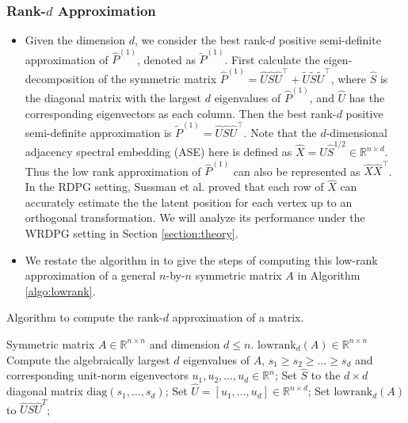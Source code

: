 \documentclass[a4paper]{article}
\renewcommand{\hat}{\widehat}
\begin{document}
\subsubsection{Rank-$d$ Approximation}
\begin{itemize}
\item Given the dimension $d$, we consider the best rank-$d$ positive semi-definite approximation of $\hat{P}^{(1)}$, denoted as $\widetilde{P}^{(1)}$. First calculate the eigen-decomposition of the symmetric matrix $\hat{P}^{(1)} = \hat{U} \hat{S} \hat{U}^{\top} + \widetilde{U} \widetilde{S} \widetilde{U}^{\top}$, where $\hat{S}$ is the diagonal matrix with the largest $d$ eigenvalues of $\hat{P}^{(1)}$, and $\hat{U}$ has the corresponding eigenvectors as each column. Then the best rank-$d$ positive semi-definite approximation is $\widetilde{P}^{(1)} = \hat{U} \hat{S} \hat{U}^{\top}$. Note that the $d$-dimensional adjacency spectral embedding (ASE) here is defined as $\hat{X} = \hat{U} \hat{S}^{1/2} \in \mathbb{R}^{n \times d}$. Thus the low rank approximation of $\hat{P}^{(1)}$ can also be represented as $\hat{X} \hat{X}^{\top}$. In the RDPG setting, Sussman et al. \cite{sussman2014consistent} proved that each row of $\hat{X}$ can accurately estimate the the latent position for each vertex up to an orthogonal transformation. We will analyze its performance under the WRDPG setting in Section \ref{section:theory}.
\item We restate the algorithm in \cite{tang2016law} to give the steps of computing this low-rank approximation of a general $n$-by-$n$ symmetric matrix $A$ in Algorithm \ref{algo:lowrank}.
\end{itemize}
\begin{algorithm}[H]
\caption{Algorithm to compute the rank-$d$ approximation of a matrix.}
\label{algo:lowrank}
\begin{algorithmic}[1]
\REQUIRE Symmetric matrix $A\in \mathbb{R}^{n \times n}$ and dimension $d\leq n$.
\ENSURE $\mathrm{lowrank}_d(A)\in \mathbb{R}^{n \times n}$
\STATE Compute the algebraically largest $d$ eigenvalues of $A$, $s_1\geq s_2\ge \dotsc \ge s_d$ and corresponding unit-norm eigenvectors $u_1,u_2,\dotsc,u_d\in \mathbb{R}^n$;
\STATE Set $\hat{S}$ to the $d\times d$ diagonal matrix $\mathrm{diag}(s_1,\dotsc,s_d)$;
\STATE Set $\hat{U} = [u_1,\dotsc,u_d]\in \mathbb{R}^{n \times d}$;
\STATE Set $\mathrm{lowrank}_d(A)$ to $\hat{U}\hat{S}\hat{U}^T$;
\end{algorithmic}
\end{algorithm}
\end{document}
